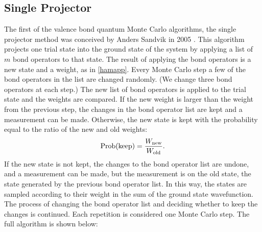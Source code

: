 \subsection{Single Projector}
The first of the valence bond quantum Monte Carlo algorithms, the single projector method was conceived by Anders Sandvik in 2005 \cite{Sandvik_vbqmc}. 
This algorithm projects one trial state into the ground state of the system by applying a list of $m$ bond operators to that state.
The result of applying the bond operators is a new state and a weight, as in \eqref{hamapp}.
Every Monte Carlo step a few of the bond operators in the list are changed randomly.  (We change three bond operators at each step.)
The new list of bond operators is applied to the trial state and the weights are compared. 
If the new weight is larger than the weight from the previous step, the changes in the bond operator list are kept and a measurement can be made.  
Otherwise, the new state is kept with the probability equal to the ratio of the new and old weights:
\begin{equation}
{\rm Prob(keep)} = \frac{W_{\rm new}}{W_{\rm old}}.
\end{equation}
If the new state is not kept, the changes to the bond operator list are undone, and a measurement can be made, but the measurement is on the old state, the state generated by the previous bond operator list.
In this way, the states are sampled according to their weight in the sum of the ground state wavefunction.
The process of changing the bond operator list and deciding whether to keep the changes is continued.  Each repetition is considered one Monte Carlo step.  
The full algorithm is shown below:
